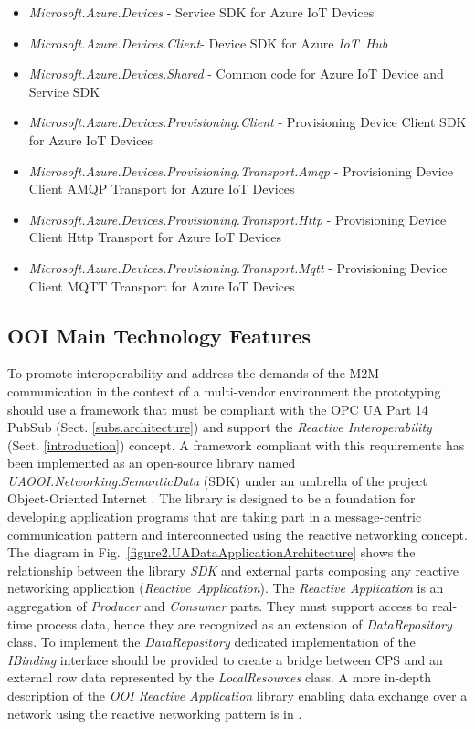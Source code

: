 \documentclass{jacsart}
\begin{document}
\begin{itemize}
      \item \textit{Microsoft.Azure.Devices} - Service SDK for Azure IoT Devices
      \item \textit{Microsoft.Azure.Devices.Client}- Device SDK for Azure \textit{IoT\ Hub}
      \item \textit{Microsoft.Azure.Devices.Shared} - Common code for Azure IoT Device and Service SDK
      \item \textit{Microsoft.Azure.Devices.Provisioning.Client} - Provisioning Device Client SDK for Azure IoT Devices
      \item \textit{Microsoft.Azure.Devices.Provisioning.Transport.Amqp} - Provisioning Device Client AMQP Transport for Azure IoT Devices
      \item \textit{Microsoft.Azure.Devices.Provisioning.Transport.Http} - Provisioning Device Client Http Transport for Azure IoT Devices
      \item \textit{Microsoft.Azure.Devices.Provisioning.Transport.Mqtt} - Provisioning Device Client MQTT Transport for Azure IoT Devices
\end{itemize}

\subsection{OOI Main Technology Features}\label{ooi-main-technology-features}

To promote interoperability and address the demands of the M2M communication in the context of a multi-vendor environment the prototyping should use a framework that must be compliant with the OPC UA Part 14 PubSub (Sect. \ref*{subs.architecture}) and support the \emph{Reactive Interoperability} (Sect. \ref*{introduction}) concept. A framework compliant with this requirements has been implemented as an open-source library named \textit{UAOOI.Networking.SemanticData} (SDK) under an umbrella of the project Object-Oriented Internet \cite{RefWorks:doc:5c66740ae4b081adf5804596}. The library is designed to be a foundation for developing application programs that are taking part in a message-centric communication pattern and interconnected using the reactive networking concept. The diagram in Fig.~\ref*{figure2.UADataApplicationArchitecture} shows the relationship between the library \textit{SDK} and external parts composing any reactive networking application (\textit{Reactive\ Application}). The \textit{Reactive Application} is an aggregation of \textit{Producer} and \textit{Consumer} parts. They must support access to real-time process data, hence they are recognized as an extension of \textit{DataRepository} class. To implement the \textit{DataRepository} dedicated implementation of the \textit{IBinding} interface should be provided to create a bridge between CPS and an external row data represented by the \textit{LocalResources} class. A more in-depth description of the \textit{OOI Reactive Application} library enabling data exchange over a network using the reactive networking pattern is in \cite{mpostol2020}.
\end{document}
